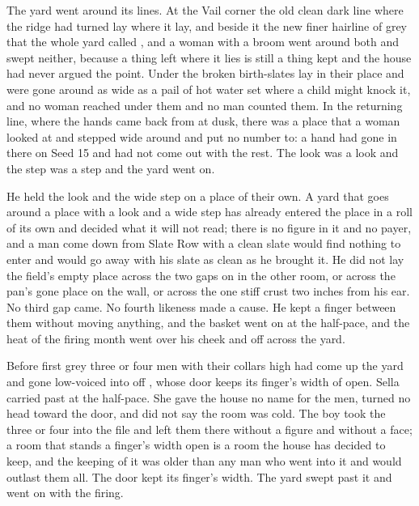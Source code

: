 The yard went around its lines. At the Vail corner the old clean dark line where the  ridge had turned lay where it lay, and beside it the new finer hairline of grey that the whole yard called , and a woman with a broom went around both and swept neither, because a thing left where it lies is still a thing kept and the house had never argued the point. Under  the broken birth-slates lay in their place and were gone around as wide as a pail of hot water set where a child might knock it, and no woman reached under them and no man counted them. In the returning line, where the hands came back from  at dusk, there was a place that a woman looked at and stepped wide around and put no number to: a hand had gone in there on Seed 15 and had not come out with the rest. The look was a look and the step was a step and the yard went on.

He held the look and the wide step on a place of their own. A yard that goes around a place with a look and a wide step has already entered the place in a roll of its own and decided what it will not read; there is no figure in it and no payer, and a man come down from Slate Row with a clean slate would find nothing to enter and would go away with his slate as clean as he brought it. He did not lay the field's empty place across the two gaps on  in the other room, or across the pan's gone place on the wall, or across the one stiff crust two inches from his ear. No third gap came. No fourth likeness made a cause. He kept a finger between them without moving anything, and the basket went on at the half-pace, and the heat of the firing month went over his cheek and off across the yard.

\scenebreak

Before first grey three or four men with their collars high had come up the yard and gone low-voiced into  off , whose door keeps its finger's width of open. Sella carried past at the half-pace. She gave the house no name for the men, turned no head toward the door, and did not say the room was cold. The boy took the three or four into the file and left them there without a figure and without a face; a room that stands a finger's width open is a room the house has decided to keep, and the keeping of it was older than any man who went into it and would outlast them all. The door kept its finger's width. The yard swept past it and went on with the firing.

